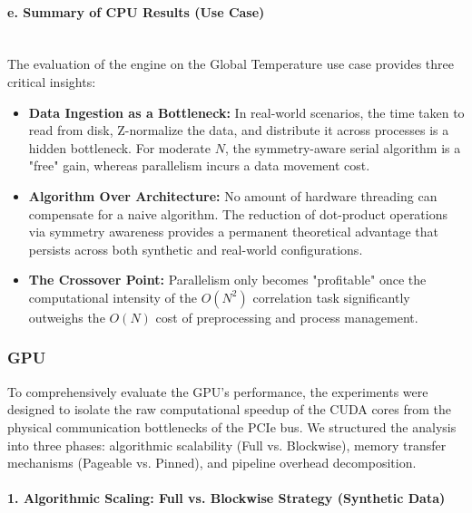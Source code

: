 \paragraph{e. Summary of CPU Results (Use Case)} \mbox{} \\ 

The evaluation of the engine on the Global Temperature use case provides three critical insights:

\begin{itemize}
    \item \textbf{Data Ingestion as a Bottleneck:} In real-world scenarios, the time taken to read from disk, Z-normalize the data, and distribute it across processes is a hidden bottleneck. For moderate $N$, the symmetry-aware serial algorithm is a "free" gain, whereas parallelism incurs a data movement cost.
    \item \textbf{Algorithm Over Architecture:} No amount of hardware threading can compensate for a naive algorithm. The reduction of dot-product operations via symmetry awareness provides a permanent theoretical advantage that persists across both synthetic and real-world configurations.
    \item \textbf{The Crossover Point:} Parallelism only becomes "profitable" once the computational intensity of the $O(N^2)$ correlation task significantly outweighs the $O(N)$ cost of preprocessing and process management.
\end{itemize}

\subsubsection{GPU}

To comprehensively evaluate the GPU's performance, the experiments were designed to isolate the raw computational speedup of the CUDA cores from the physical communication bottlenecks of the PCIe bus. We structured the analysis into three phases: algorithmic scalability (Full vs. Blockwise), memory transfer mechanisms (Pageable vs. Pinned), and pipeline overhead decomposition.

\paragraph{1. Algorithmic Scaling: Full vs. Blockwise Strategy (Synthetic Data)} \mbox{} \\

